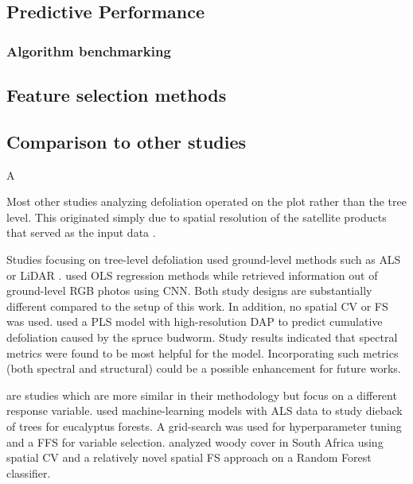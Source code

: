 \documentclass[review]{elsarticle}
\begin{document}
\subsection{Predictive Performance}

\subsubsection{Algorithm benchmarking}

\subsection{Feature selection methods}

\subsection{Comparison to other studies}A

\noindent Most other studies analyzing defoliation operated on the plot rather than the tree level.
This originated simply due to spatial resolution of the satellite products that served as the input data \citep{townsend2012, debeurs2008a, rengarajan2016}.

Studies focusing on tree-level defoliation used ground-level methods such as \ac{ALS} or \ac{LiDAR} \citep{meng2018, kalin2019}.
\cite{meng2018} used \ac{OLS} regression methods while \cite{kalin2019} retrieved information out of ground-level RGB photos using \ac{CNN}.
Both study designs are substantially different compared to the setup of this work.
In addition, no spatial \ac{CV} or \ac{FS} was used.
\cite{goodbody2018} used a \ac{PLS} model with high-resolution \ac{DAP} to predict cumulative defoliation caused by the spruce budworm.
Study results indicated that spectral metrics were found to be most helpful for the model.
Incorporating such metrics (both spectral and structural) could be a possible enhancement for future works.

\cite{shendryk2016, ludwig2019} are studies which are more similar in their methodology but focus on a different response variable.
\cite{shendryk2016} used machine-learning models with \ac{ALS} data to study dieback of trees for eucalyptus forests.
A grid-search was used for hyperparameter tuning and a \ac{FFS} for variable selection.
\cite{ludwig2019} analyzed woody cover in South Africa using spatial \ac{CV} and a relatively novel spatial \ac{FS} approach \citep{meyer2018} on a Random Forest classifier.
\end{document}
